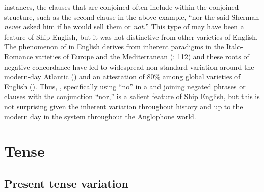 instances, the clauses that are conjoined often include  within the conjoined structure, such as the second clause in the above example, “nor the said Sherman \textit{never} asked him if he would sell them or \textit{not.}” This type of  may have been a feature of Ship English, but it was not distinctive from other varieties of English. The phenomenon of  in English derives from inherent  paradigms in the Italo-Romance varieties of Europe and the Mediterranean (\citealt{WillisEtAl2013}: 112) and these roots of negative concordance have led to widespread non-standard variation around the modern-day Atlantic (\citealt{vanderAuwera2016}) and an attestation of 80\%  among global varieties of English (\citealt{KortmannLunkenheimer2013}). Thus, , specifically using “no” in a  and joining negated phrases or clauses with the conjunction “nor,” is a salient feature of Ship English, but this is not surprising given the inherent variation throughout history and up to the modern day in the  system throughout the Anglophone world.  

\section{{Tense}}\label{sec:6.2}

\subsection{{Present tense variation} }\label{sec:6.2.1}

